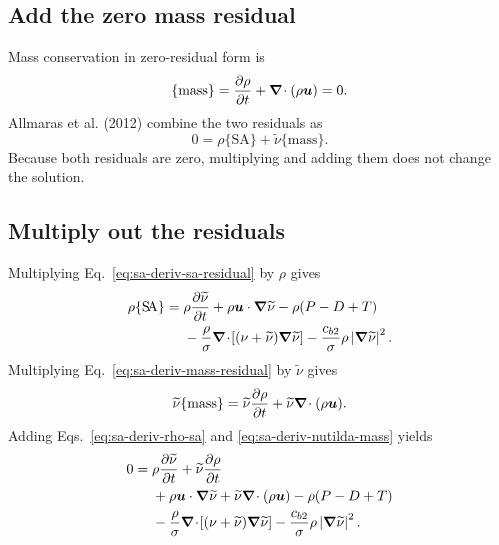 \subsection{Add the zero mass residual}

Mass conservation in zero-residual form is
\begin{equation}
  \{\mathrm{mass}\}
  =\frac{\partial\rho}{\partial t}
  +\boldsymbol{\nabla}\!\cdot(\rho\boldsymbol u)
  =0.
  \label{eq:sa-deriv-mass-residual}
\end{equation}
Allmaras et al. (2012) combine the two residuals as
\begin{equation}
  0=\rho\{\mathrm{S\!A}\}
  +\widetilde{\nu}\{\mathrm{mass}\}.
  \label{eq:sa-deriv-combined-residuals}
\end{equation}
Because both residuals are zero, multiplying and adding them does not change
the solution.

\Needspace{0.38\textheight}
\subsection{Multiply out the residuals}

Multiplying Eq.~\eqref{eq:sa-deriv-sa-residual} by \(\rho\) gives
\begin{align}
  \rho\{\mathrm{S\!A}\}={}&
  \rho\frac{\partial\widetilde{\nu}}{\partial t}
  +\rho\boldsymbol u\mathbin{\cdot}\boldsymbol{\nabla}\widetilde{\nu}
  -\rho(P-D+T) \notag\\
  &-\frac{\rho}{\sigma}
   \boldsymbol{\nabla}\!\cdot\!\left[(\nu+\widetilde{\nu})\boldsymbol{\nabla}\widetilde{\nu}\right]
  -\frac{c_{b2}}{\sigma}\rho
   \left|\boldsymbol{\nabla}\widetilde{\nu}\right|^2.
  \label{eq:sa-deriv-rho-sa}
\end{align}
Multiplying Eq.~\eqref{eq:sa-deriv-mass-residual} by
\(\widetilde{\nu}\) gives
\begin{equation}
  \widetilde{\nu}\{\mathrm{mass}\}
  =\widetilde{\nu}\frac{\partial\rho}{\partial t}
  +\widetilde{\nu}\boldsymbol{\nabla}\!\cdot(\rho\boldsymbol u).
  \label{eq:sa-deriv-nutilda-mass}
\end{equation}
Adding Eqs.~\eqref{eq:sa-deriv-rho-sa} and
\eqref{eq:sa-deriv-nutilda-mass} yields
\begin{align}
  0={}&
  \rho\frac{\partial\widetilde{\nu}}{\partial t}
  +\widetilde{\nu}\frac{\partial\rho}{\partial t} \notag\\
  &+\rho\boldsymbol u\mathbin{\cdot}\boldsymbol{\nabla}\widetilde{\nu}
  +\widetilde{\nu}\boldsymbol{\nabla}\!\cdot(\rho\boldsymbol u)
  -\rho(P-D+T) \notag\\
  &-\frac{\rho}{\sigma}
   \boldsymbol{\nabla}\!\cdot\!\left[(\nu+\widetilde{\nu})\boldsymbol{\nabla}\widetilde{\nu}\right]
  -\frac{c_{b2}}{\sigma}\rho
   \left|\boldsymbol{\nabla}\widetilde{\nu}\right|^2.
  \label{eq:sa-deriv-expanded-sum}
\end{align}

